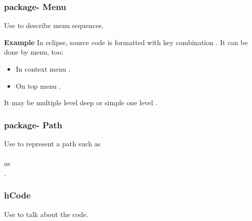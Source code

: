 \documentclass[aspectratio=169,10pt,compress]{beamer}
\begin{document}
\begin{frame}[t,fragile] \frametitle{ package- Menu}
	
	Use  to describe menu sequences.
	
	\textbf{Example}
	In eclipse, source code is formatted with key combination
	.
	It can be done by menu, too:
	\begin{itemize}
		
		\item 
		In context menu 
		.
	
		\item 
		On top menu .
		
	\end{itemize}

	It may be multiple level deep
	 or simple one level 
	.
\end{frame}




\begin{frame}[t,fragile] \frametitle{ package- Path}
	
	Use \hCode{\directory} to represent 
	a path such as\\
	 \\
	as\\
	.

\end{frame}




\begin{frame}[t,fragile] \frametitle{hCode}
	Use  to talk about the code.

\end{frame}








\end{document}
